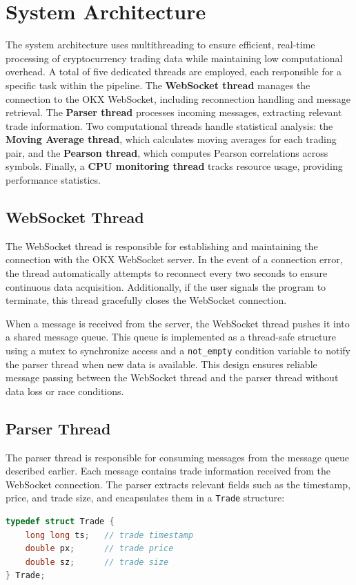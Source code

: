 \documentclass[11pt]{article}
\begin{document}
\section{System Architecture}

The system architecture uses multithreading to ensure efficient, real-time processing of cryptocurrency trading data while maintaining low computational overhead. A total of five dedicated threads are employed, each responsible for a specific task within the pipeline. The \textbf{WebSocket thread} manages the connection to the OKX WebSocket, including reconnection handling and message retrieval. The \textbf{Parser thread} processes incoming messages, extracting relevant trade information. Two computational threads handle statistical analysis: the \textbf{Moving Average thread}, which calculates moving averages for each trading pair, and the \textbf{Pearson thread}, which computes Pearson correlations across symbols. Finally, a \textbf{CPU monitoring thread} tracks resource usage, providing performance statistics.

\subsection{WebSocket Thread}

The WebSocket thread is responsible for establishing and maintaining the connection with the OKX WebSocket server. In the event of a connection error, the thread automatically attempts to reconnect every two seconds to ensure continuous data acquisition. Additionally, if the user signals the program to terminate, this thread gracefully closes the WebSocket connection.  

When a message is received from the server, the WebSocket thread pushes it into a shared message queue. This queue is implemented as a thread-safe structure using a mutex to synchronize access and a \texttt{not\_empty} condition variable to notify the parser thread when new data is available. This design ensures reliable message passing between the WebSocket thread and the parser thread without data loss or race conditions.

\subsection{Parser Thread}

The parser thread is responsible for consuming messages from the message queue described earlier. Each message contains trade information received from the WebSocket connection. The parser extracts relevant fields such as the timestamp, price, and trade size, and encapsulates them in a \texttt{Trade} structure:
\begin{lstlisting}[language=C]
typedef struct Trade {
    long long ts;   // trade timestamp
    double px;      // trade price
    double sz;      // trade size
} Trade;
\end{lstlisting}
\end{document}
